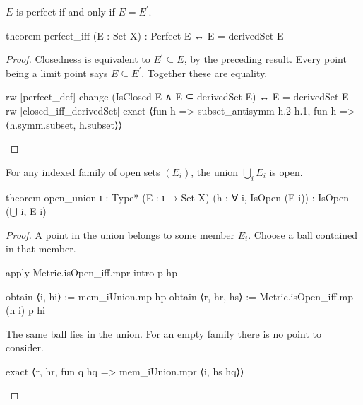 \begin{lemma}
  \label{ma:lem:perfect-iff}
  $E$ is perfect if and only if $E=E^{\prime}$.

  \begin{lean}
    theorem perfect_iff (E : Set X) : Perfect E ↔ E = derivedSet E
  \end{lean}
\end{lemma}

\begin{proof}
  Closedness is equivalent to $E^{\prime}\subseteq E$, by the preceding result.
  Every point being a limit point says $E\subseteq E^{\prime}$.
  Together these are equality.

  \begin{lean}
    rw [perfect_def]
    change (IsClosed E ∧ E ⊆ derivedSet E) ↔ E = derivedSet E
    rw [closed_iff_derivedSet]
    exact ⟨fun h => subset_antisymm h.2 h.1, fun h => ⟨h.symm.subset, h.subset⟩⟩
  \end{lean}
\end{proof}

\begin{proposition}
  \label{ma:thm:arbitrary-union-of-open-sets-is-open}
  For any indexed family of open sets $(E_i)$, the union $\bigcup_i E_i$ is open.

  \begin{lean}
    theorem open_union {ι : Type*} (E : ι → Set X)
        (h : ∀ i, IsOpen (E i)) : IsOpen (⋃ i, E i)
  \end{lean}
\end{proposition}

\begin{proof}
  A point in the union belongs to some member $E_i$.
  Choose a ball contained in that member.

  \begin{lean}
    apply Metric.isOpen_iff.mpr
    intro p hp

    obtain ⟨i, hi⟩ := mem_iUnion.mp hp
    obtain ⟨r, hr, hs⟩ := Metric.isOpen_iff.mp (h i) p hi
  \end{lean}

  The same ball lies in the union.
  For an empty family there is no point to consider.

  \begin{lean}
    exact ⟨r, hr, fun q hq => mem_iUnion.mpr ⟨i, hs hq⟩⟩
  \end{lean}
\end{proof}

